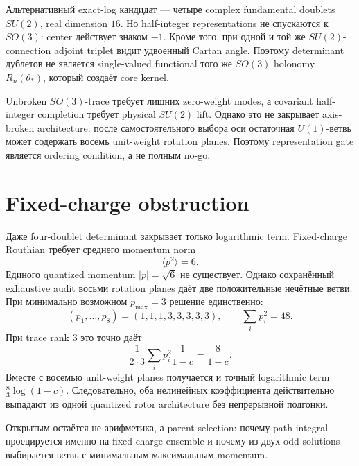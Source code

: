 Альтернативный exact-log кандидат --- четыре complex fundamental doublets
\(SU(2)\), real dimension \(16\). Но half-integer representations не
спускаются к \(SO(3)\): center действует знаком \(-1\). Кроме того, при
одной и той же \(SU(2)\)-connection adjoint triplet видит удвоенный Cartan
angle. Поэтому determinant дублетов не является single-valued functional
того же \(SO(3)\) holonomy \(R_n(\theta_*)\), который создаёт core kernel.

\begin{proposition}
Unbroken \(SO(3)\)-trace требует лишних zero-weight modes, а covariant
half-integer completion требует physical \(SU(2)\) lift. Однако это не
закрывает axis-broken architecture: после самостоятельного выбора оси
остаточная \(U(1)\)-ветвь может содержать восемь unit-weight rotation
planes. Поэтому representation gate является ordering condition, а не
полным no-go.
\end{proposition}

\section{Fixed-charge obstruction}

Даже four-doublet determinant закрывает только logarithmic term. Fixed-charge
Routhian требует среднего momentum norm
\begin{equation}
 \langle p^2\rangle=6.
\end{equation}
Единого quantized momentum \(|p|=\sqrt6\) не существует. Однако сохранённый
exhaustive audit восьми rotation planes даёт две положительные нечётные
ветви. При минимально возможном \(p_{\max}=3\) решение единственно:
\begin{equation}
 (p_1,\ldots,p_8)=(1,1,1,3,3,3,3,3),
 \qquad
 \sum_i p_i^2=48.
\end{equation}
При trace rank \(3\) это точно даёт
\begin{equation}
 \frac{1}{2\cdot3}\sum_i p_i^2\frac1{1-c}
 =\frac8{1-c}.
\end{equation}
Вместе с восемью unit-weight planes получается и точный logarithmic term
\(\frac83\log(1-c)\). Следовательно, оба нелинейных коэффициента действительно
выпадают из одной quantized rotor architecture без непрерывной подгонки.

Открытым остаётся не арифметика, а parent selection: почему path integral
проецируется именно на fixed-charge ensemble и почему из двух odd solutions
выбирается ветвь с минимальным максимальным momentum.

